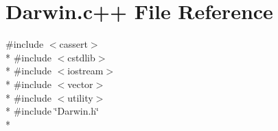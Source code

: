 \hypertarget{Darwin_8c_09_09}{\section{Darwin.\-c++ File Reference}
\label{Darwin_8c_09_09}
}
{\ttfamily \#include $<$cassert$>$}\\*
{\ttfamily \#include $<$cstdlib$>$}\\*
{\ttfamily \#include $<$iostream$>$}\\*
{\ttfamily \#include $<$vector$>$}\\*
{\ttfamily \#include $<$utility$>$}\\*
{\ttfamily \#include \char`\"{}Darwin.\-h\char`\"{}}\\*
